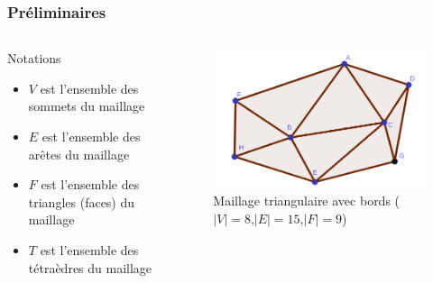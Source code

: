 \documentclass[9pt]{beamer}
\begin{document}
\begin{frame}
\footnotesize
\frametitle{Préliminaires}

  \begin{columns}[c]
    \begin{column}[c]{.48\textwidth}
 		\begin{block}{Notations}
\begin{itemize}
\item $V$ est l'ensemble des sommets du maillage
\item $E$ est l'ensemble des arêtes du maillage
\item $F$ est l'ensemble des triangles (faces) du maillage
\item $T$ est l'ensemble des tétraèdres du maillage
\end{itemize}
\end{block}
    \end{column}%
    \hfill%
    \begin{column}[c]{.48\textwidth}
    \begin{figure}
    \includegraphics[scale=0.19]{Images/planar_graph}
\caption{Maillage triangulaire avec bords ($|V|=8$,$|E|=15$,$|F|=9$)}
    \end{figure}
    \end{column}%
  \end{columns}



\end{frame}
\end{document}
